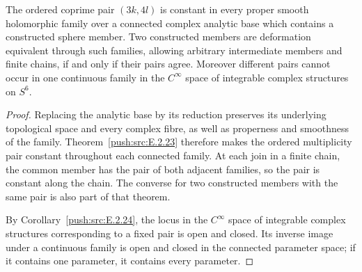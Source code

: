 \begin{corollary}\hypertarget{tag-033C}{}\label{push:src:E.2.4}

The ordered coprime pair $(3k,4l)$ is constant in every
proper smooth holomorphic family over a connected complex
analytic base which contains a constructed sphere member.
Two constructed members are deformation equivalent through
such families, allowing arbitrary intermediate members and
finite chains, if and only if their pairs agree.
Moreover different pairs cannot occur in one continuous
family in the $C^\infty$ space of integrable complex
structures on $S^6$.
\end{corollary}


\begin{proof}
Replacing the analytic base by its reduction preserves its underlying
topological space and every complex fibre, as well as properness and
smoothness of the family. Theorem~\ref{push:src:E.2.23} therefore makes
the ordered multiplicity pair constant throughout each connected family.
At each join in a finite chain, the common member has the pair of both
adjacent families, so the pair is constant along the chain. The converse
for two constructed members with the same pair is also part of that theorem.

By Corollary~\ref{push:src:E.2.24}, the locus in the $C^\infty$ space of
integrable complex structures corresponding to a fixed pair is open and
closed. Its inverse image under a continuous family is open and closed
in the connected parameter space; if it contains one parameter, it
contains every parameter.
\end{proof}